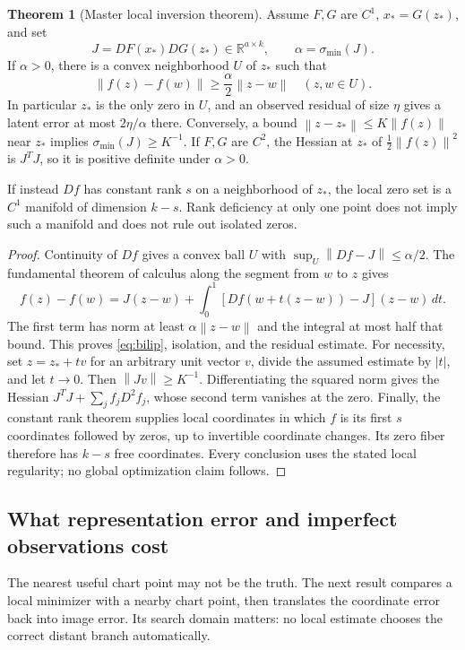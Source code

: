 \documentclass[11pt,a4paper]{article}
\theoremstyle{definition}
\newtheorem{theorem}{Theorem}[section]
\theoremstyle{definition}
\theoremstyle{remark}\newtheorem{remark}[theorem]{Remark}
\newcommand{\R}{\mathbb R}\newcommand{\Prob}{\mathbb P}\newcommand{\E}{\mathbb E}
\newcommand{\smin}{\sigma_{\min}}\newcommand{\smax}{\sigma_{\max}}
\newcommand{\norm}[1]{\left\lVert #1\right\rVert}
\begin{document}
\begin{theorem}[Master local inversion theorem]\label{thm:master}
Assume $F,G$ are $C^1$, $x_*=G(z_*)$, and set
\[
J=DF(x_*)DG(z_*)\in\R^{a\times k},\qquad \alpha=\smin(J).
\]
If $\alpha>0$, there is a convex neighborhood $U$ of $z_*$ such that
\begin{equation}\label{eq:bilip}
\norm{f(z)-f(w)}\ge\frac\alpha2\norm{z-w}\quad(z,w\in U).
\end{equation}
In particular $z_*$ is the only zero in $U$, and an observed residual of size $\eta$ gives a latent error at most $2\eta/\alpha$ there. Conversely, a bound $\norm{z-z_*}\le K\norm{f(z)}$ near $z_*$ implies $\smin(J)\ge K^{-1}$. If $F,G$ are $C^2$, the Hessian at $z_*$ of $\frac12\norm{f(z)}^2$ is $J^TJ$, so it is positive definite under $\alpha>0$.

If instead $Df$ has constant rank $s$ on a neighborhood of $z_*$, the local zero set is a $C^1$ manifold of dimension $k-s$. Rank deficiency at only one point does not imply such a manifold and does not rule out isolated zeros.
\end{theorem}
\begin{proof}
Continuity of $Df$ gives a convex ball $U$ with $\sup_U\norm{Df-J}\le\alpha/2$. The fundamental theorem of calculus along the segment from $w$ to $z$ gives
\[
f(z)-f(w)=J(z-w)+\int_0^1[Df(w+t(z-w))-J](z-w)\,dt.
\]
The first term has norm at least $\alpha\norm{z-w}$ and the integral at most half that bound. This proves \eqref{eq:bilip}, isolation, and the residual estimate. For necessity, set $z=z_*+tv$ for an arbitrary unit vector $v$, divide the assumed estimate by $|t|$, and let $t\to0$. Then $\norm{Jv}\ge K^{-1}$. Differentiating the squared norm gives the Hessian $J^TJ+\sum_j f_jD^2f_j$, whose second term vanishes at the zero. Finally, the constant rank theorem supplies local coordinates in which $f$ is its first $s$ coordinates followed by zeros, up to invertible coordinate changes. Its zero fiber therefore has $k-s$ free coordinates. Every conclusion uses the stated local regularity; no global optimization claim follows.
\end{proof}

\subsection{What representation error and imperfect observations cost}

The nearest useful chart point may not be the truth. The next result compares a local minimizer with a nearby chart point, then translates the coordinate error back into image error. Its search domain matters: no local estimate chooses the correct distant branch automatically.
\end{document}

